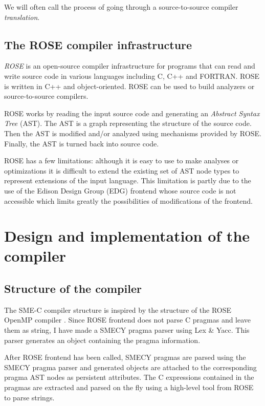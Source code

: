\documentclass [A4]{article}
\begin{document}
	We will often call the process of going through a source-to-source compiler \emph{translation}.
	

	\subsection{The ROSE compiler infrastructure}
	\emph{ROSE} is an open-source compiler infrastructure for programs that can read and write source code in various languages including C, C++ and FORTRAN. ROSE is written in C++ and object-oriented. ROSE can be used to build analyzers or source-to-source compilers.
	
	ROSE works by reading the input source code and generating an \emph{Abstract Syntax Tree} (AST). The AST is a graph representing the structure of the source code. Then the AST is modified and/or analyzed using mechanisms provided by ROSE. Finally, the AST is turned back into source code.
	
	ROSE has a few limitations: although it is easy to use to make analyses or optimizations it is difficult to extend the existing set of AST node types to represent extensions of the input language. This limitation is partly due to the use of the Edison Design Group (EDG) frontend whose source code is not accessible which limits greatly the possibilities of modifications of the frontend.
	
\section{Design and implementation of the compiler}

	\subsection{Structure of the compiler}
	The SME-C compiler structure is inspired by the structure of the ROSE OpenMP compiler \cite{roseomp}. Since ROSE frontend does not parse C pragmas and leave them as string, I have made a SMECY pragma parser using Lex \& Yacc. This parser generates an object containing the pragma information.
	
	After ROSE frontend has been called, SMECY pragmas are parsed using the SMECY pragma parser and generated objects are attached to the corresponding pragma AST nodes as persistent attributes. The C expressions contained in the pragmas are extracted and parsed on the fly using a high-level tool from ROSE to parse strings.
	
\end{document}
